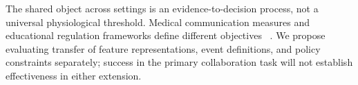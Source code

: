 The shared object across settings is an evidence-to-decision process, not a universal physiological threshold. Medical communication measures and educational regulation frameworks define different objectives ~\cite{p66,p29}. We propose evaluating transfer of feature representations, event definitions, and policy constraints separately; success in the primary collaboration task will not establish effectiveness in either extension.

